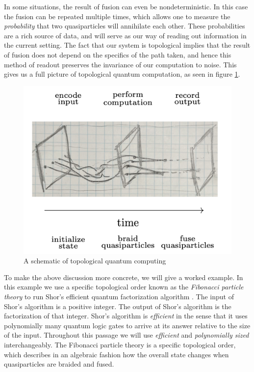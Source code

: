 \documentclass{article}
\theoremstyle{definition}
\numberwithin{figure}{section}
\begin{document}
In some situations, the result of fusion can even be nondeterministic. In this case the fusion can be repeated multiple times, which allows one to measure the \textit{probability} that two quasiparticles will annihilate each other. These probabilities are a rich source of data, and will serve as our way of reading out information in the current setting. The fact that our system is topological implies that the result of fusion does not depend on the specifics of the path taken, and hence this method of readout preserves the invariance of our computation to noise. This gives us a full picture of topological quantum computation, as seen in figure \ref{fig:TQC-outline}.

\begin{figure}
\begin{center}
\includegraphics[scale=0.35]{TQC-outline}
\caption{A schematic of topological quantum computing}
\label{fig:TQC-outline}
\end{center}
\end{figure}

To make the above discussion more concrete, we will give a worked example. In this example we use a specific topological order known as the \textit{Fibonacci particle theory} to run Shor’s efficient quantum factorization algorithm \cite{shor1994algorithms}. The input of Shor’s algorithm is a positive integer. The output of Shor’s algorithm is the factorization of that integer. Shor’s algorithm is \textit{efficient} in the sense that it uses polynomially many quantum logic gates to arrive at its answer relative to the size of the input. Throughout this passage we will use \textit{efficient} and \textit{polynomially sized} interchangeably. The Fibonacci particle theory is a specific topological order, which describes in an algebraic fashion how the overall state changes when quasiparticles are braided and fused.
\end{document}
